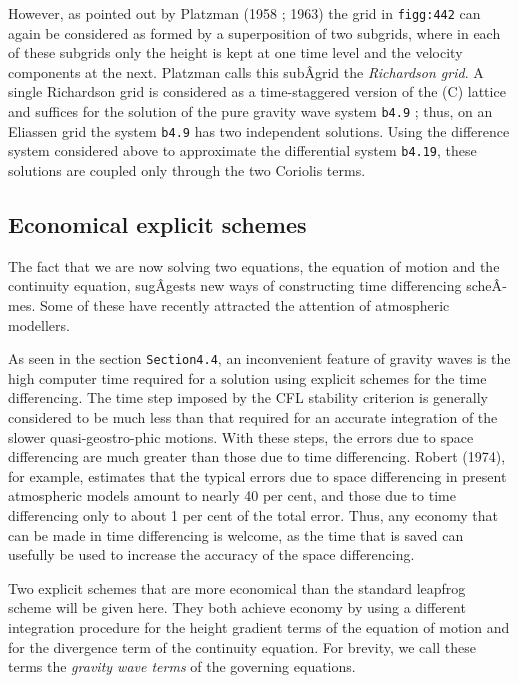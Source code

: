 However, as pointed out by Platzman (1958 ; 1963) the grid in
\texttt{figg:442} can again be considered as formed by a superposition
of two subgrids, where in each of these subgrids only the height is kept
at one time level and the velocity components at the next. Platzman
calls this subÂ­grid the \emph{Richardson grid}. A single Richardson grid
is considered as a time-staggered version of the (C) lattice and
suffices for the solution of the pure gravity wave system \texttt{b4.9}
; thus, on an Eliassen grid the system \texttt{b4.9} has two independent
solutions. Using the difference system considered above to approximate
the differential system \texttt{b4.19}, these solutions are coupled only
through the two Coriolis terms.

\begin{figure}
\centering
{}
\caption{}
\end{figure}

\subsection{\texorpdfstring{\textbf{Economical explicit
schemes}}{Economical explicit schemes}}\label{economical-explicit-schemes}

The fact that we are now solving two equations, the equation of motion
and the continuity equation, sugÂ­gests new ways of constructing time
differencing scheÂ­mes. Some of these have recently attracted the
attention of atmospheric modellers.

As seen in the section \texttt{Section4.4}, an inconvenient feature of
gravity waves is the high computer time required for a solution using
explicit schemes for the time differencing. The time step imposed by the
CFL stability criterion is generally considered to be much less than
that required for an accurate integration of the slower
quasi-geostro-phic motions. With these steps, the errors due to space
differencing are much greater than those due to time differencing.
Robert (1974), for example, estimates that the typical errors due to
space differencing in present atmospheric models amount to nearly 40 per
cent, and those due to time differencing only to about 1 per cent of the
total error. Thus, any economy that can be made in time differencing is
welcome, as the time that is saved can usefully be used to increase the
accuracy of the space differencing.

Two explicit schemes that are more economical than the standard leapfrog
scheme will be given here. They both achieve economy by using a
different integration procedure for the height gradient terms of the
equation of motion and for the divergence term of the continuity
equation. For brevity, we call these terms the \emph{gravity wave terms}
of the governing equations.

